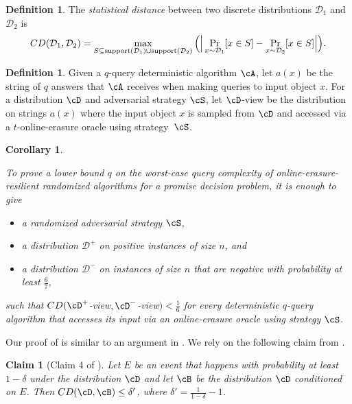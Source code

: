 \documentclass[11pt]{article}
\numberwithin{equation}{section}
\newtheorem{corollary}[theorem]{Corollary}
\newtheorem{claim}[theorem]{Claim}
\theoremstyle{definition}
\newtheorem{definition}[theorem]{Definition}
\theoremstyle{plain}
\begin{document}
	
	\begin{definition}The {\em statistical distance} between two discrete distributions $\mathcal{D}_1$ and $\mathcal{D}_2$ is
\begin{align*}
	    CD(\mathcal{D}_1, \mathcal{D}_2) = \max_{S \subseteq \textnormal{support}(\mathcal{D}_1) \cup \textnormal{support}(\mathcal{D}_2)} \Big( \Big| \Pr_{x \sim \mathcal{D}_1} [ x \in S] - \Pr_{x \sim \mathcal{D}_2} [ x \in S] \Big|\Big).
\end{align*}
	\end{definition}
	
\begin{definition} Given a $q$-query deterministic algorithm $\cA$, let $a(x)$ be the string of $q$ answers that $\cA$ receives when making queries to input object $x$. For a distribution $\cD$ and adversarial strategy $\cS$, let $\cD$-view be the distribution on strings $a(x)$ where the input object $x$ is sampled from $\cD$ and accessed via a $t$-online-erasure oracle using strategy~$\cS$. 
\end{definition}
	

	
	
		\begin{corollary}\label{cor:yao_2}
		
To prove a lower bound $q$ on the worst-case query complexity of online-erasure-resilient randomized algorithms for a promise decision problem,
		it is enough to give 
		\begin{itemize}
		\item a randomized adversarial strategy $\cS$,
			\item a distribution $\mathcal{D}^+$ on positive instances of size $n$, and
			
			\item a distribution $\mathcal{D}^-$ on instances of size $n$ that are negative with probability at least $\frac{6}{7}$,
		\end{itemize}
		such that $CD(\cD^+$-view$, \cD^-$-view$) < \frac{1}{6}$ for every deterministic $q$-query algorithm that accesses its input via an online-erasure oracle using strategy $\cS$. 
	\end{corollary} 

%
%
Our proof of  is similar to
an argument in \cite{RS06}. We rely on the following claim from \cite{RS06}.


	\begin{claim}[Claim 4 of \cite{RS06}]\label{clm:bad_event}
	Let $E$ be an event that happens with probability at least $1-\delta$ under the distribution $\cD$ and let $\cB$ be the distribution $\cD$ conditioned on $E$. Then $CD(\cD, \cB) \leq \delta'$, where $\delta' = \frac{1}{1-\delta} - 1$. 
	\end{claim}
%
%
%
%
%
%
%
%
%
\end{document}

